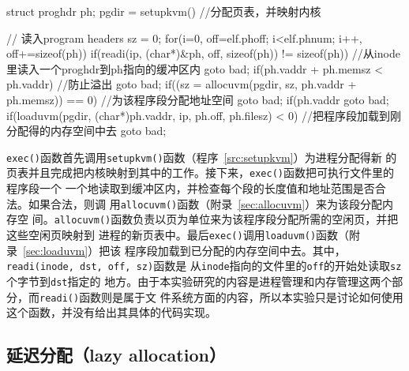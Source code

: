 \documentclass{swfcthesismscctex}
\begin{document}
\begin{listing}
  \begin{codeblock}
\begin{ccode}
  struct proghdr ph;
  pgdir = setupkvm() //分配页表，并映射内核

  // 读入program headers
  sz = 0;
  for(i=0, off=elf.phoff; i<elf.phnum; i++, off+=sizeof(ph)){
    if(readi(ip, (char*)&ph, off, sizeof(ph)) != sizeof(ph)) //从inode里读入一个proghdr到ph指向的缓冲区内
      goto bad;
      if(ph.vaddr + ph.memsz < ph.vaddr) //防止溢出
      goto bad;
    if((sz = allocuvm(pgdir, sz, ph.vaddr + ph.memsz)) == 0) //为该程序段分配地址空间
      goto bad;
    if(ph.vaddr %
      goto bad;
    if(loaduvm(pgdir, (char*)ph.vaddr, ip, ph.off, ph.filesz) < 0) //把程序段加载到刚分配得的内存空间中去
      goto bad;
  }
\end{ccode}
  \end{codeblock}
  \label{src:exec}
\end{listing}

\texttt{exec()}函数首先调用\texttt{setupkvm()}函数（程序~\ref{src:setupkvm}）为进程分配得新
的页表并且完成把内核映射到其中的工作。接下来，\texttt{exec()}函数把可执行文件里的程序段一个
一个地读取到缓冲区内，并检查每个段的长度值和地址范围是否合法。如果合法，则调
用\texttt{allocuvm()}函数（附录~\ref{sec:allocuvm}）来为该段分配内存空
间。\texttt{allocuvm()}函数负责以页为单位来为该程序段分配所需的空闲页，并把这些空闲页映射到
进程的新页表中。最后\texttt{exec()}调用\texttt{loaduvm()}函数（附录~\ref{sec:loaduvm}）把该
程序段加载到已分配的内存空间中去。其中，\texttt{readi(inode, dst, off, sz)}函数是
从\texttt{inode}指向的文件里的\texttt{off}的开始处读取\texttt{sz}个字节到\texttt{dst}指定的
地方。由于本实验研究的内容是进程管理和内存管理这两个部分，而\texttt{readi()}函数则是属于文
件系统方面的内容，所以本实验只是讨论如何使用这个函数，并没有给出其具体的代码实现。

\subsection{延迟分配（lazy allocation）}
\end{document}

